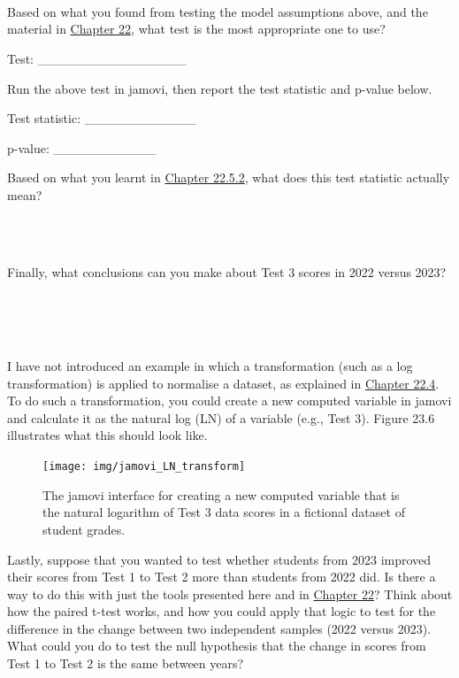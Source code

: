 \documentclass[
]{scrbook}
\begin{document}
\begin{verbatim}




\end{verbatim}

Based on what you found from testing the model assumptions above, and the material in \protect\hyperlink{Chapter_22}{Chapter 22}, what test is the most appropriate one to use?

Test: \_\_\_\_\_\_\_\_\_\_\_\_\_\_\_\_

Run the above test in jamovi, then report the test statistic and p-value below.

Test statistic: \_\_\_\_\_\_\_\_\_\_\_\_

p-value: \_\_\_\_\_\_\_\_\_\_\_

Based on what you learnt in \protect\hyperlink{mann-whitney-u-test}{Chapter 22.5.2}, what does this test statistic actually mean?

\begin{verbatim}



\end{verbatim}

Finally, what conclusions can you make about Test 3 scores in 2022 versus 2023?

\begin{verbatim}




\end{verbatim}

I have not introduced an example in which a transformation (such as a log transformation) is applied to normalise a dataset, as explained in \protect\hyperlink{assumptions-of-t-tests}{Chapter 22.4}.
To do such a transformation, you could create a new computed variable in jamovi and calculate it as the natural log (LN) of a variable (e.g., Test 3).
Figure 23.6 illustrates what this should look like.

\begin{figure}
\texttt{[image: img/jamovi\_LN\_transform]} \caption{The jamovi interface for creating a new computed variable that is the natural logarithm of Test 3 data scores in a fictional dataset of student grades.}\label{fig:unnamed-chunk-106}
\end{figure}

Lastly, suppose that you wanted to test whether students from 2023 improved their scores from Test 1 to Test 2 more than students from 2022 did.
Is there a way to do this with just the tools presented here and in \protect\hyperlink{Chapter_22}{Chapter 22}?
Think about how the paired t-test works, and how you could apply that logic to test for the difference in the change between two independent samples (2022 versus 2023).
What could you do to test the null hypothesis that the change in scores from Test 1 to Test 2 is the same between years?
\end{document}
